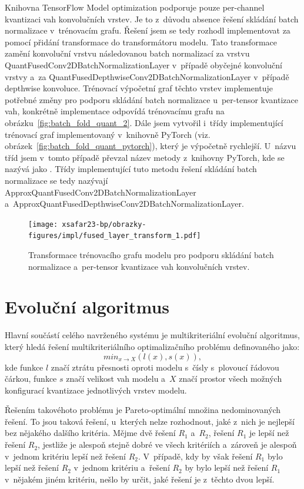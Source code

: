 Knihovna TensorFlow Model optimization podporuje pouze per-channel kvantizaci vah konvolučních vrstev. Je to z~důvodu absence řešení skládání batch normalizace v~trénovacím grafu. Řešení jsem se tedy rozhodl implementovat za pomocí přidání transformace do transformátoru modelu. Tato transformace zamění konvoluční vrstvu následovanou batch normalizací za vrstvu QuantFusedConv2DBatchNormalizationLayer v~případě obyčejné konvoluční vrstvy a~za QuantFusedDepthwiseConv2DBatchNormalizationLayer v~případě depthwise konvoluce. Trénovací výpočetní graf těchto vrstev implementuje potřebné změny pro podporu skládání batch normalizace u~per-tensor kvantizace vah, konkrétně implementace odpovídá trénovacímu grafu na obrázku~\ref{fig:batch_fold_quant_2}. Dále jsem vytvořil i~třídy implementující trénovací graf implementovaný v~knihovně PyTorch (viz. obrázek~\ref{fig:batch_fold_quant_pytorch}), který je výpočetně rychlejší. U~názvu tříd jsem v~tomto případě převzal název metody z~knihovny PyTorch, kde se nazývá jako . Třídy implementující tuto metodu řešení skládání batch normalizace se tedy nazývají ApproxQuantFusedConv2DBatchNormalizationLayer a~ApproxQuantFusedDepthwiseConv2DBatchNormalizationLayer.

\begin{figure}[H]
	\centering
	\texttt{[image: xsafar23-bp/obrazky-figures/impl/fused\_layer\_transform\_1.pdf]}
	\caption{Transformace trénovacího grafu modelu pro podporu skládání batch normalizace a~per-tensor kvantizace vah konvolučních vrstev.}
	\label{fig:fused_transform} 
\end{figure}

\section{Evoluční algoritmus}

Hlavní součástí celého navrženého systému je multikriteriální evoluční algoritmus, který hledá řešení multikriteriálního optimalizačního problému definovaného jako:
\begin{equation}
    min_{x \rightarrow X}(l(x), s(x)),
\end{equation}
kde funkce $l$ značí ztrátu přesnosti oproti modelu s~čísly s~plovoucí řádovou čárkou, funkce $s$ značí velikost vah modelu a~$X$ značí prostor všech možných konfigurací kvantizace jednotlivých vrstev modelu.

Řešením takovéhoto problému je Pareto-optimální množina nedominovaných řešení. To jsou taková řešení, u~kterých nelze rozhodnout, jaké z~nich je nejlepší bez nějakého dalšího kritéria.  Mějme dvě řešení $R_1$ a~$R_2$, řešení $R_1$ je lepší než řešení $R_2$, jestliže je alespoň stejně dobré ve všech kritériích a~zároveň je alespoň v~jednom kritériu lepší než řešení $R_2$. V~případě, kdy by však řešení $R_1$ bylo lepší než řešení $R_2$ v~jednom kritériu a~řešení $R_2$ by bylo lepší než řešení $R_1$ v~nějakém jiném kritériu, nešlo by určit, jaké řešení je z~těchto dvou lepší. 


